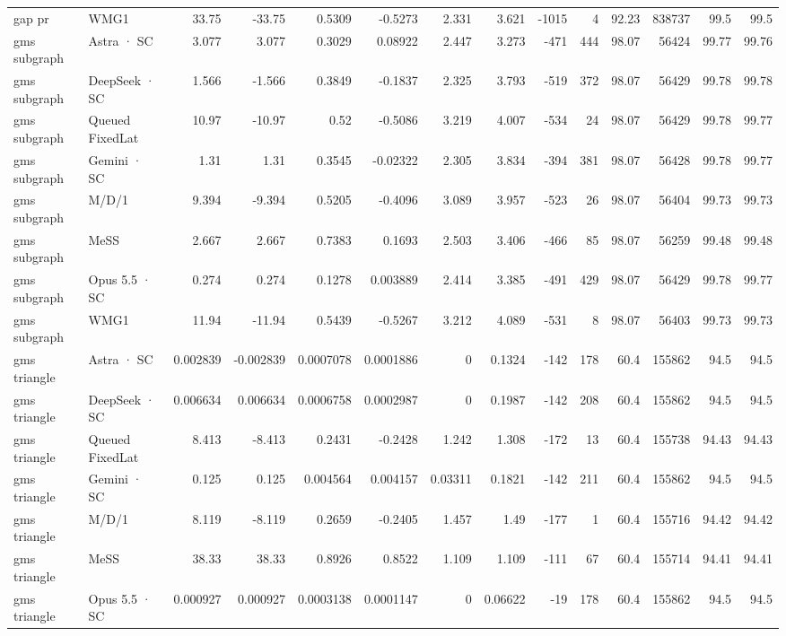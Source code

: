 \begin{tabular}{llrrrrrrrrrrrr}
gap pr & WMG1 & 33.75 & -33.75 & 0.5309 & -0.5273 & 2.331 & 3.621 & -1015 & 4 & 92.23 & 838737 & 99.5 & 99.5 \\
gms subgraph & Astra · SC & 3.077 & 3.077 & 0.3029 & 0.08922 & 2.447 & 3.273 & -471 & 444 & 98.07 & 56424 & 99.77 & 99.76 \\
gms subgraph & DeepSeek · SC & 1.566 & -1.566 & 0.3849 & -0.1837 & 2.325 & 3.793 & -519 & 372 & 98.07 & 56429 & 99.78 & 99.78 \\
gms subgraph & Queued FixedLat & 10.97 & -10.97 & 0.52 & -0.5086 & 3.219 & 4.007 & -534 & 24 & 98.07 & 56429 & 99.78 & 99.77 \\
gms subgraph & Gemini · SC & 1.31 & 1.31 & 0.3545 & -0.02322 & 2.305 & 3.834 & -394 & 381 & 98.07 & 56428 & 99.78 & 99.77 \\
gms subgraph & M/D/1 & 9.394 & -9.394 & 0.5205 & -0.4096 & 3.089 & 3.957 & -523 & 26 & 98.07 & 56404 & 99.73 & 99.73 \\
gms subgraph & MeSS & 2.667 & 2.667 & 0.7383 & 0.1693 & 2.503 & 3.406 & -466 & 85 & 98.07 & 56259 & 99.48 & 99.48 \\
gms subgraph & Opus 5.5 · SC & 0.274 & 0.274 & 0.1278 & 0.003889 & 2.414 & 3.385 & -491 & 429 & 98.07 & 56429 & 99.78 & 99.77 \\
gms subgraph & WMG1 & 11.94 & -11.94 & 0.5439 & -0.5267 & 3.212 & 4.089 & -531 & 8 & 98.07 & 56403 & 99.73 & 99.73 \\
gms triangle & Astra · SC & 0.002839 & -0.002839 & 0.0007078 & 0.0001886 & 0 & 0.1324 & -142 & 178 & 60.4 & 155862 & 94.5 & 94.5 \\
gms triangle & DeepSeek · SC & 0.006634 & 0.006634 & 0.0006758 & 0.0002987 & 0 & 0.1987 & -142 & 208 & 60.4 & 155862 & 94.5 & 94.5 \\
gms triangle & Queued FixedLat & 8.413 & -8.413 & 0.2431 & -0.2428 & 1.242 & 1.308 & -172 & 13 & 60.4 & 155738 & 94.43 & 94.43 \\
gms triangle & Gemini · SC & 0.125 & 0.125 & 0.004564 & 0.004157 & 0.03311 & 0.1821 & -142 & 211 & 60.4 & 155862 & 94.5 & 94.5 \\
gms triangle & M/D/1 & 8.119 & -8.119 & 0.2659 & -0.2405 & 1.457 & 1.49 & -177 & 1 & 60.4 & 155716 & 94.42 & 94.42 \\
gms triangle & MeSS & 38.33 & 38.33 & 0.8926 & 0.8522 & 1.109 & 1.109 & -111 & 67 & 60.4 & 155714 & 94.41 & 94.41 \\
gms triangle & Opus 5.5 · SC & 0.000927 & 0.000927 & 0.0003138 & 0.0001147 & 0 & 0.06622 & -19 & 178 & 60.4 & 155862 & 94.5 & 94.5 \\

\end{tabular}
